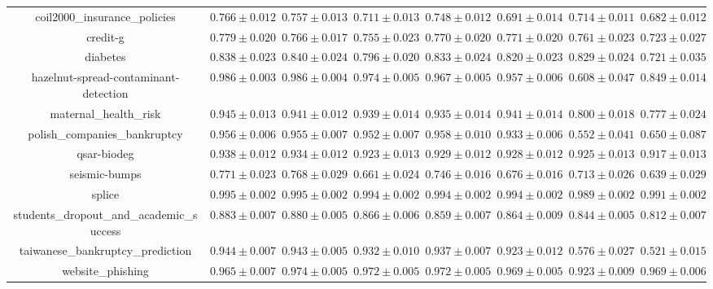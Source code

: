 \documentclass[11pt]{article}
\begin{document}
\begin{table}[htbp]
{\begin{tabular}{cccccccc}
coil2000\_insurance\_policies & $0.766 \pm 0.012$ & $0.757 \pm 0.013$ & $0.711 \pm 0.013$ & $0.748 \pm 0.012$ & $0.691 \pm 0.014$ & $0.714 \pm 0.011$ & $0.682 \pm 0.012$  \\
credit-g & $0.779 \pm 0.020$ & $0.766 \pm 0.017$ & $0.755 \pm 0.023$ & $0.770 \pm 0.020$ & $0.771 \pm 0.020$ & $0.761 \pm 0.023$ & $0.723 \pm 0.027$  \\
diabetes & $0.838 \pm 0.023$ & $0.840 \pm 0.024$ & $0.796 \pm 0.020$ & $0.833 \pm 0.024$ & $0.820 \pm 0.023$ & $0.829 \pm 0.024$ & $0.721 \pm 0.035$  \\
hazelnut-spread-contaminant-detection & $0.986 \pm 0.003$ & $0.986 \pm 0.004$ & $0.974 \pm 0.005$ & $0.967 \pm 0.005$ & $0.957 \pm 0.006$ & $0.608 \pm 0.047$ & $0.849 \pm 0.014$  \\
maternal\_health\_risk & $0.945 \pm 0.013$ & $0.941 \pm 0.012$ & $0.939 \pm 0.014$ & $0.935 \pm 0.014$ & $0.941 \pm 0.014$ & $0.800 \pm 0.018$ & $0.777 \pm 0.024$  \\
polish\_companies\_bankruptcy & $0.956 \pm 0.006$ & $0.955 \pm 0.007$ & $0.952 \pm 0.007$ & $0.958 \pm 0.010$ & $0.933 \pm 0.006$ & $0.552 \pm 0.041$ & $0.650 \pm 0.087$  \\
qsar-biodeg & $0.938 \pm 0.012$ & $0.934 \pm 0.012$ & $0.923 \pm 0.013$ & $0.929 \pm 0.012$ & $0.928 \pm 0.012$ & $0.925 \pm 0.013$ & $0.917 \pm 0.013$  \\
seismic-bumps & $0.771 \pm 0.023$ & $0.768 \pm 0.029$ & $0.661 \pm 0.024$ & $0.746 \pm 0.016$ & $0.676 \pm 0.016$ & $0.713 \pm 0.026$ & $0.639 \pm 0.029$  \\
splice & $0.995 \pm 0.002$ & $0.995 \pm 0.002$ & $0.994 \pm 0.002$ & $0.994 \pm 0.002$ & $0.994 \pm 0.002$ & $0.989 \pm 0.002$ & $0.991 \pm 0.002$  \\
students\_dropout\_and\_academic\_success & $0.883 \pm 0.007$ & $0.880 \pm 0.005$ & $0.866 \pm 0.006$ & $0.859 \pm 0.007$ & $0.864 \pm 0.009$ & $0.844 \pm 0.005$ & $0.812 \pm 0.007$  \\
taiwanese\_bankruptcy\_prediction & $0.944 \pm 0.007$ & $0.943 \pm 0.005$ & $0.932 \pm 0.010$ & $0.937 \pm 0.007$ & $0.923 \pm 0.012$ & $0.576 \pm 0.027$ & $0.521 \pm 0.015$  \\
website\_phishing & $0.965 \pm 0.007$ & $0.974 \pm 0.005$ & $0.972 \pm 0.005$ & $0.972 \pm 0.005$ & $0.969 \pm 0.005$ & $0.923 \pm 0.009$ & $0.969 \pm 0.006$  \\
\bottomrule
\end{tabular}
}
\end{table}
\end{document}
